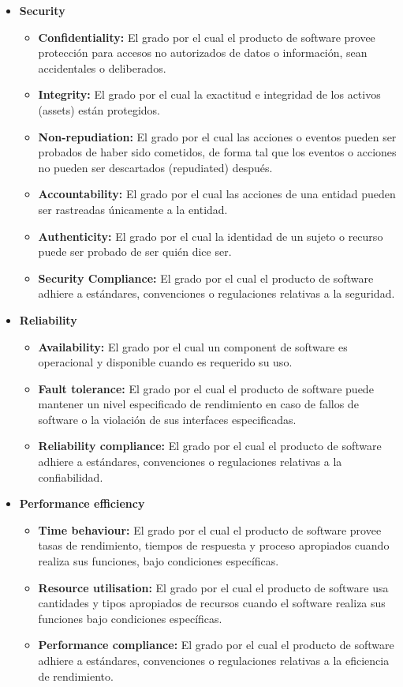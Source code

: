 \begin{itemize}
	\item \textbf{Security}
		\begin{itemize}
		\item \textbf{Confidentiality:} El grado por el cual el producto de software provee protección
			para accesos no autorizados de datos o información, sean accidentales o deliberados.
		\item \textbf{Integrity:} El grado por el cual la exactitud e integridad de los activos (assets) están protegidos.
		\item \textbf{Non-repudiation:} El grado por el cual las acciones o eventos pueden ser probados de haber sido 
			cometidos, de forma tal que los eventos o acciones no pueden ser descartados (repudiated) después.		
		\item \textbf{Accountability:} El grado por el cual las acciones de una entidad pueden ser rastreadas
			únicamente a la entidad. 
		\item \textbf{Authenticity:} El grado por el cual la identidad de un sujeto o recurso puede ser probado 
			de ser quién dice ser.
		\item \textbf{Security Compliance:} El grado por el cual el producto de software adhiere a estándares,
			convenciones o regulaciones relativas a la seguridad.
		\end{itemize}
		
	\item \textbf{Reliability}
		\begin{itemize}
		\item \textbf{Availability:} El grado por el cual un component de software es operacional y disponible
			cuando es requerido su uso.
		\item \textbf{Fault tolerance:} El grado por el cual el producto de software puede mantener un nivel
			especificado de rendimiento en caso de fallos de software o la violación de sus interfaces especificadas.
		\item \textbf{Reliability compliance:} El grado por el cual el producto de software adhiere a estándares, convenciones
			o regulaciones relativas a la confiabilidad.
		\end{itemize}
	
	\item \textbf{Performance efficiency}
		\begin{itemize}
		\item \textbf{Time behaviour:} El grado por el cual el producto de software provee tasas de rendimiento, tiempos de respuesta
			y proceso apropiados cuando realiza sus funciones, bajo condiciones específicas.
		\item \textbf{Resource utilisation:} El grado por el cual el producto de software usa cantidades y tipos
			apropiados de recursos cuando el software realiza sus funciones bajo condiciones específicas.
		\item \textbf{Performance compliance:} El grado por el cual el producto de software adhiere a estándares, convenciones
			o regulaciones relativas a la eficiencia de rendimiento.
		\end{itemize}
		

\end{itemize}
